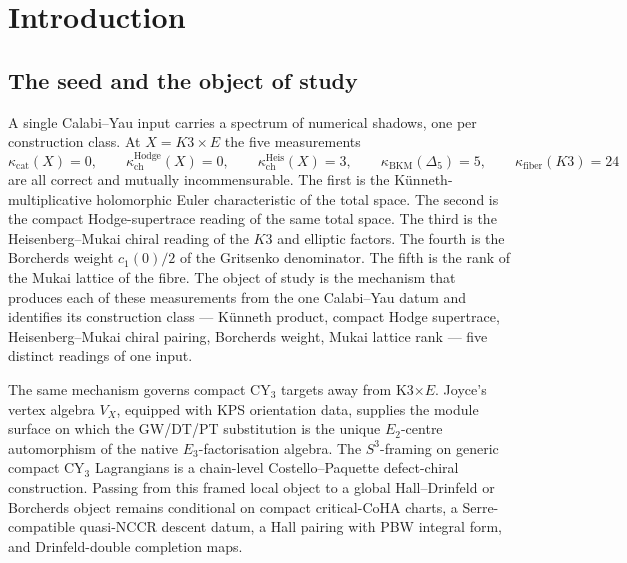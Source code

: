 \chapter{Introduction}
\label{ch:introduction}

\providecommand{\kBKM}{\kappa_{\mathrm{BKM}}}
\providecommand{\kch}{\kappa_{\mathrm{ch}}}
\providecommand{\kcat}{\kappa_{\mathrm{cat}}}
\providecommand{\kfib}{\kappa_{\mathrm{fiber}}}
\providecommand{\CYcat}{\mathrm{CY}\text{-cat}}
\providecommand{\ChirAlg}{\mathrm{ChirAlg}}
\providecommand{\HolFA}{\mathrm{HolFA}}
\providecommand{\hCS}{\mathrm{hCS}}
\providecommand{\Sp}{\mathrm{Sp}}
\providecommand{\cF}{\mathcal{F}}
\providecommand{\cE}{\mathcal{E}}
\providecommand{\cO}{\mathcal{O}}
\providecommand{\cM}{\mathcal{M}}
\providecommand{\fg}{\mathfrak{g}}
\providecommand{\CoHA}{\mathrm{CoHA}}
\providecommand{\Meff}{\mathcal{M}^{+}_{\mathrm{eff}}}
\providecommand{\ZZ}{\mathbb{Z}}
\providecommand{\CC}{\mathbb{C}}
\providecommand{\bH}{\mathbf{H}}

\section{The seed and the object of study}
\label{wn:sec:platonic-intro-object}

A single Calabi--Yau input carries a spectrum of numerical shadows,
one per construction class. At $X = K3\times E$ the five measurements
\[
 \kcat(X)=0,\qquad
 \kappa_{\mathrm{ch}}^{\mathrm{Hodge}}(X)=0,\qquad
 \kappa_{\mathrm{ch}}^{\mathrm{Heis}}(X)=3,\qquad
 \kBKM(\Delta_5)=5,\qquad
 \kfib(K3)=24
\]
are all correct and mutually incommensurable. The first is the
K\"unneth-multiplicative holomorphic Euler characteristic of the total
space. The second is the compact Hodge-supertrace reading of the
same total space. The third is the Heisenberg--Mukai chiral reading
of the $K3$ and elliptic factors. The fourth is the Borcherds weight
$c_1(0)/2$ of the Gritsenko denominator. The fifth is the rank of
the Mukai lattice of the fibre. The object of study is the mechanism
that produces each of these measurements from the one Calabi--Yau
datum and identifies its construction class — K\"unneth product,
compact Hodge supertrace, Heisenberg--Mukai chiral pairing, Borcherds
weight, Mukai lattice rank — five distinct readings of one input.

The same mechanism governs compact CY$_3$ targets away from
K3$\times E$. Joyce's vertex algebra \(V_X\), equipped with KPS
orientation data, supplies the module surface on which the
GW/DT/PT substitution is the unique \(E_2\)-centre automorphism of the
native \(E_3\)-factorisation algebra. The \(S^3\)-framing on generic
compact CY$_3$ Lagrangians is a chain-level Costello--Paquette
defect-chiral construction. Passing from this framed local object to
a global Hall--Drinfeld or Borcherds object remains conditional on
compact critical-CoHA charts, a Serre-compatible quasi-NCCR descent
datum, a Hall pairing with PBW integral form, and Drinfeld-double
completion maps.


